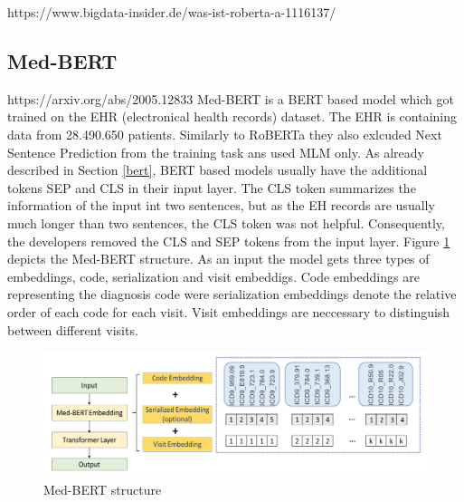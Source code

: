 \alert{https://www.bigdata-insider.de/was-ist-roberta-a-1116137/}
\subsection{Med-BERT}
\alert{https://arxiv.org/abs/2005.12833}
Med-BERT is a BERT based model which got trained on the EHR (electronical health records) dataset. The EHR is containing data from 28.490.650 patients. Similarly to RoBERTa they also exlcuded Next Sentence Prediction from the training task ans used MLM only. As already described in Section \ref{bert}, BERT based models usually have the additional tokens SEP and CLS in their input layer. The CLS token summarizes the information of the input int two sentences, but as the EH records are usually much longer than two sentences, the CLS token was not helpful. Consequently, the developers removed the CLS and SEP tokens from the input layer. \newline
Figure \ref{fig:medbert} depicts the Med-BERT structure. As an input the model gets three types of embeddings, code, serialization and visit embeddigs. Code embeddings are representing the diagnosis code were serialization embeddings denote the relative order of each code for each visit. Visit embeddings are neccessary to distinguish between different visits.

\begin{figure}[H]
	\centering
	\includegraphics[width=1\textwidth]{figures/medbert.PNG}
	\caption{Med-BERT structure}
	\label{fig:medbert}
\end{figure}


